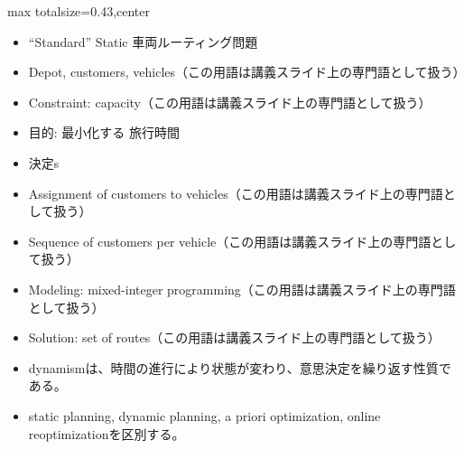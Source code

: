 \clearpage
{}
\begin{minipage}[t]{0.405\textwidth}
\begin{adjustbox}{max totalsize={\textwidth}{0.43\textheight},center}
\begin{minipage}{\textwidth}\scriptsize
{}\begin{itemize}
\item “Standard” Static 車両ルーティング問題
\item Depot, customers, vehicles（この用語は講義スライド上の専門語として扱う）
\item Constraint: capacity（この用語は講義スライド上の専門語として扱う）
\item 目的: 最小化する 旅行時間
\item 決定s
\item Assignment of customers to vehicles（この用語は講義スライド上の専門語として扱う）
\item Sequence of customers per vehicle（この用語は講義スライド上の専門語として扱う）
\item Modeling: mixed-integer programming（この用語は講義スライド上の専門語として扱う）
\item Solution: set of routes（この用語は講義スライド上の専門語として扱う）
\end{itemize}\begin{itemize}
\item dynamismは、時間の進行により状態が変わり、意思決定を繰り返す性質である。
\item static planning, dynamic planning, a priori optimization, online reoptimizationを区別する。
\end{itemize}
\end{minipage}
\end{adjustbox}
\end{minipage}\hfill
